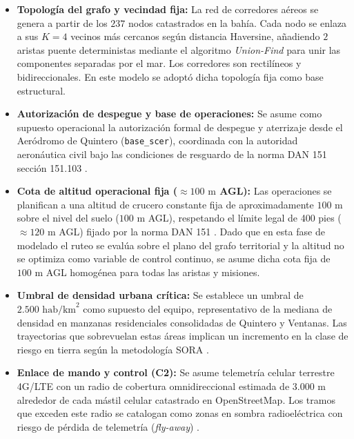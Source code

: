 \documentclass[letterpaper,12pt]{article}
\begin{document}
\begin{itemize}
    \item[\textbf{S1.}] \textbf{Topología del grafo y vecindad fija:} La red de corredores aéreos se genera a partir de los $237$ nodos catastrados en la bahía. Cada nodo se enlaza a sus $K=4$ vecinos más cercanos según distancia Haversine, añadiendo $2$ aristas puente deterministas mediante el algoritmo \textit{Union-Find} para unir las componentes separadas por el mar. Los corredores son rectilíneos y bidireccionales. En este modelo se adoptó dicha topología fija como base estructural.
    \item[\textbf{S2.}] \textbf{Autorización de despegue y base de operaciones:} Se asume como supuesto operacional la autorización formal de despegue y aterrizaje desde el Aeródromo de Quintero (\texttt{base\_scer}), coordinada con la autoridad aeronáutica civil bajo las condiciones de resguardo de la norma DAN 151 sección 151.103 \cite{dan151}.
    \item[\textbf{S3.}] \textbf{Cota de altitud operacional fija ($\approx 100\text{ m}$ AGL):} Las operaciones se planifican a una altitud de crucero constante fija de aproximadamente $100\text{ m}$ sobre el nivel del suelo ($100\text{ m}$ AGL), respetando el límite legal de 400 pies ($\approx 120\text{ m}$ AGL) fijado por la norma DAN 151 \cite{dan151}. Dado que en esta fase de modelado el ruteo se evalúa sobre el plano del grafo territorial y la altitud no se optimiza como variable de control continuo, se asume dicha cota fija de $100\text{ m}$ AGL homogénea para todas las aristas y misiones.
    \item[\textbf{S4.}] \textbf{Umbral de densidad urbana crítica:} Se establece un umbral de $2.500\text{ hab/km}^2$ como supuesto del equipo, representativo de la mediana de densidad en manzanas residenciales consolidadas de Quintero y Ventanas. Las trayectorias que sobrevuelan estas áreas implican un incremento en la clase de riesgo en tierra según la metodología SORA \cite{sora}.
    \item[\textbf{S5.}] \textbf{Enlace de mando y control (C2):} Se asume telemetría celular terrestre 4G/LTE con un radio de cobertura omnidireccional estimada de $3.000\text{ m}$ alrededor de cada mástil celular catastrado en OpenStreetMap. Los tramos que exceden este radio se catalogan como zonas en sombra radioeléctrica con riesgo de pérdida de telemetría (\textit{fly-away}) \cite{petritoli}.

\end{itemize}
\end{document}
